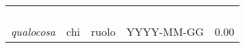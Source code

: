 \newpage 
\section*{}
\begin{table}[H]
	\centering
	\begin{tabular}{p{4cm}|C{3cm}|C{3cm}|R{2.5cm}|R{2cm}}
		
		 & & & & \\
		
		
		\emph{}	 & & & & \\
		\hline
		
		\emph{}& & & & \\
		\hline
		
		\emph{}& & & & \\
		\hline
		
		\emph{qualocosa} & chi & ruolo & YYYY-MM-GG & 0.00 \\
		
	\end{tabular}
	
\end{table}


\clearpage